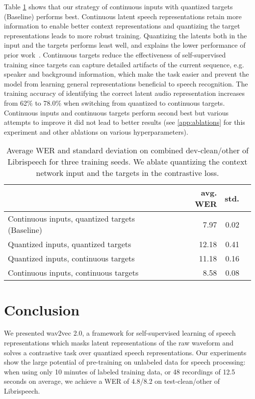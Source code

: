 \documentclass{article}
\newcommand{\wvpp}{wav2vec 2.0}
\newcommand{\libri}{Librispeech}
\begin{document}
Table \ref{tbl:quantization} shows that our strategy of continuous inputs with quantized targets (Baseline) performs best. 
Continuous latent speech representations retain more information to enable better context representations and quantizing the target representations leads to more robust training.
Quantizing the latents both in the input and the targets performs least well, and explains the lower performance of prior work~\citep{baevski2019vqwav2vec,baevski2019effectiveness}.
Continuous targets reduce the effectiveness of self-supervised training since targets can capture detailed artifacts of the current sequence, e.g. speaker and background information, which make the task easier and prevent the model from learning general representations beneficial to speech recognition.
The training accuracy of identifying the correct latent audio representation increases from 62\% to 78.0\% when switching from quantized to continuous targets.
Continuous inputs and continuous targets perform second best but various attempts to improve it did not lead to better results (see \autoref{app:ablations} for this experiment and other ablations on various hyperparameters).


\begin{table}[t]
\caption{Average WER and standard deviation on combined dev-clean/other of \libri{} for three training seeds. We ablate quantizing the context network input and the targets in the contrastive loss.
}
\label{tbl:quantization}
\centering
\begin{tabular}{lrrr}
\toprule
{} & avg. WER & std. \\
\midrule
Continuous inputs, quantized targets (Baseline) & 7.97 & 0.02  \\
Quantized inputs, quantized targets & 12.18 & 0.41 \\
Quantized inputs, continuous targets & 11.18 & 0.16 \\
Continuous inputs, continuous targets & 8.58 & 0.08 \\
\bottomrule
\end{tabular}
\end{table}

\section{Conclusion}

We presented \wvpp{}, a framework for self-supervised learning of speech representations which masks latent representations of the raw waveform and solves a contrastive task over quantized speech representations.
Our experiments show the large potential of pre-training on unlabeled data for speech processing: 
when using only 10 minutes of labeled training data, or 48 recordings of 12.5 seconds on average, we achieve a WER of 4.8/8.2 on test-clean/other of \libri{}. 
\end{document}
